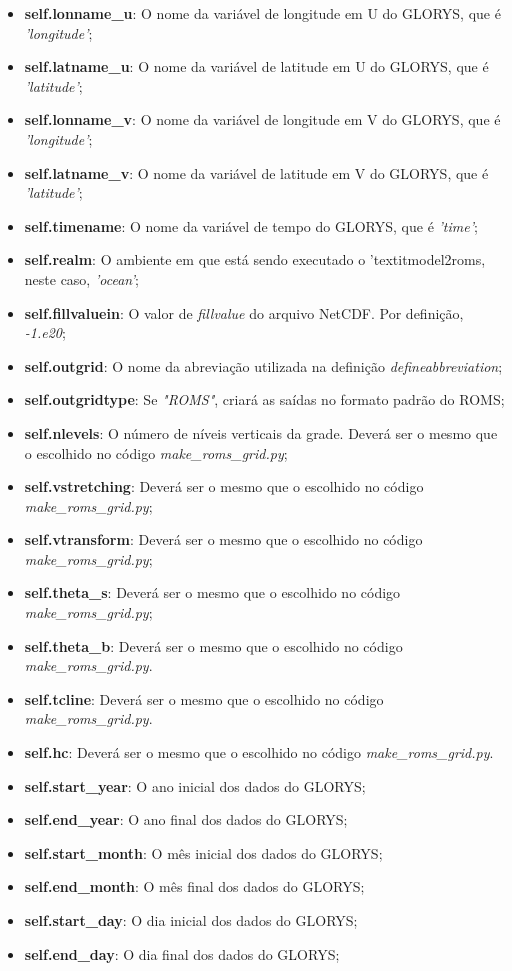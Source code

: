 \begin{itemize}
    \item \textbf{self.lonname\_u}: O nome da variável de longitude em U do GLORYS, que é \textit{'longitude'};
    \item \textbf{self.latname\_u}: O nome da variável de latitude em U do GLORYS, que é \textit{'latitude'};
    \item \textbf{self.lonname\_v}: O nome da variável de longitude em V do GLORYS, que é \textit{'longitude'};
    \item \textbf{self.latname\_v}: O nome da variável de latitude em V do GLORYS, que é \textit{'latitude'};
    \item \textbf{self.timename}: O nome da variável de tempo do GLORYS, que é \textit{'time'};
    \item \textbf{self.realm}: O ambiente em que está sendo executado o 'textit{model2roms}, neste caso, \textit{'ocean'};
    \item \textbf{self.fillvaluein}: O valor de \textit{fillvalue} do arquivo NetCDF. Por definição, \textit{-1.e20};
    \item \textbf{self.outgrid}: O nome da abreviação utilizada na definição \textit{defineabbreviation};
    \item \textbf{self.outgridtype}: Se \textit{"ROMS"}, criará as saídas no formato padrão do ROMS;
    \item \textbf{self.nlevels}: O número de níveis verticais da grade. Deverá ser o mesmo que o escolhido no código \textit{make\_roms\_grid.py};
    \item \textbf{self.vstretching}: Deverá ser o mesmo que o escolhido no código \textit{make\_roms\_grid.py};
    \item \textbf{self.vtransform}: Deverá ser o mesmo que o escolhido no código \textit{make\_roms\_grid.py};
    \item \textbf{self.theta\_s}: Deverá ser o mesmo que o escolhido no código \textit{make\_roms\_grid.py};
    \item \textbf{self.theta\_b}: Deverá ser o mesmo que o escolhido no código \textit{make\_roms\_grid.py}.
    \item \textbf{self.tcline}: Deverá ser o mesmo que o escolhido no código \textit{make\_roms\_grid.py}.   
    \item \textbf{self.hc}: Deverá ser o mesmo que o escolhido no código \textit{make\_roms\_grid.py}.
    \item \textbf{self.start\_year}: O ano inicial dos dados do GLORYS;
    \item \textbf{self.end\_year}: O ano final dos dados do GLORYS;  
    \item \textbf{self.start\_month}: O mês inicial dos dados do GLORYS;  
    \item \textbf{self.end\_month}: O mês final dos dados do GLORYS;  
    \item \textbf{self.start\_day}: O dia inicial dos dados do GLORYS;  
    \item \textbf{self.end\_day}: O dia final dos dados do GLORYS;    
\end{itemize}
\bigskip

